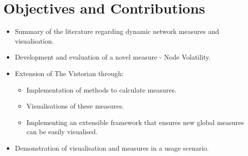 \section{Objectives and Contributions}
\label{objectives}
\begin{itemize}
    \item Summary of the literature regarding dynamic network measures and visualisation.
    \item Development and evaluation of a novel measure - Node Volatility.
    \item Extension of The Vistorian through:
    \begin{itemize}
        \item Implementation of methods to calculate measures.
        \item Visualisations of these measures.
        \item Implementing an extensible framework that ensures new global measures can be easily visualised.
    \end{itemize}
    \item Demonstration of visualisation and measures in a usage scenario.


\end{itemize}





